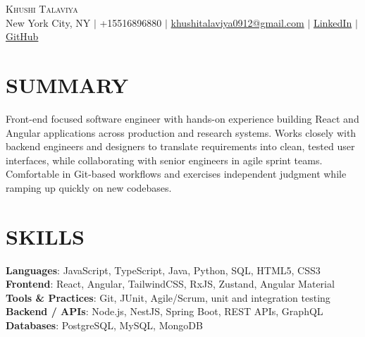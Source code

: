 \documentclass[letterpaper,11pt]{article}
\begin{document}
\begin{center}
    {\Huge \scshape Khushi Talaviya} \\ \vspace{2pt}
    \vspace{4pt}
    \small
    New York City, NY $|$
    \small
    +15516896880 $|$
    \href{mailto:khushitalaviya0912@gmail.com}{khushitalaviya0912@gmail.com} $|$
    \href{https://www.linkedin.com/in/khushitalaviya/}{LinkedIn} $|$
    \href{https://github.com/talaviyakhushi}{GitHub}
\end{center}

\section{SUMMARY}
\vspace{5pt}
\small{Front-end focused software engineer with hands-on experience building React and Angular applications across production and research systems. Works closely with backend engineers and designers to translate requirements into clean, tested user interfaces, while collaborating with senior engineers in agile sprint teams. Comfortable in Git-based workflows and exercises independent judgment while ramping up quickly on new codebases.}

\vspace{2pt}
\section{SKILLS}
\vspace{5pt}
\begin{itemize}[leftmargin=0in, label={}]
\small{\item{
\textbf{Languages}{: JavaScript, TypeScript, Java, Python, SQL, HTML5, CSS3} \\
\textbf{Frontend}{: React, Angular, TailwindCSS, RxJS, Zustand, Angular Material} \\
\textbf{Tools \& Practices}{: Git, JUnit, Agile/Scrum, unit and integration testing} \\
\textbf{Backend / APIs}{: Node.js, NestJS, Spring Boot, REST APIs, GraphQL} \\
\textbf{Databases}{: PostgreSQL, MySQL, MongoDB}
}}
\end{itemize}
\vspace{-10pt}

\end{document}
